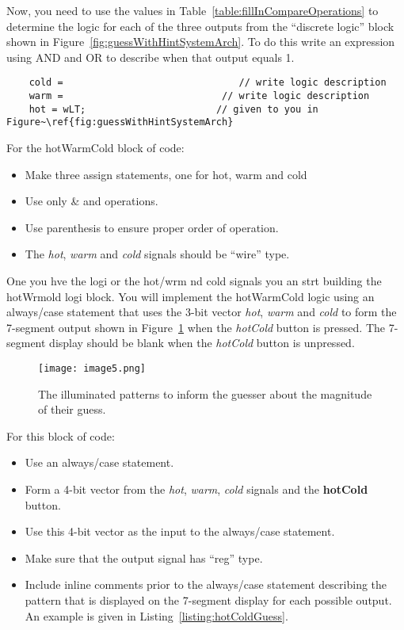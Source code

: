 Now, you need to use the values in Table~\ref{table:fillInCompareOperations} to determine the logic for
each of the three outputs from the ``discrete logic'' block shown in
Figure~\ref{fig:guessWithHintSystemArch}. To do this write an expression using AND and OR to 
describe when that
output equals 1.  

\protect\hypertarget{hotWarmCold_Logic}{}{}
\begin{verbatim}
	cold =                               // write logic description
	warm =                            // write logic description
	hot = wLT;                       // given to you in  Figure~\ref{fig:guessWithHintSystemArch}
\end{verbatim}

For the hotWarmCold block of code:

\begin{itemize}
\item
  Make three assign statements, one for hot, warm and cold
\item
  Use only \& and \textbar{} operations.
\item
  Use parenthesis to ensure proper order of operation.
\item
  The \emph{hot}, \emph{warm} and \emph{cold} signals should be ``wire''
  type.
\end{itemize}

One you hve the logi or the hot/wrm nd cold signals you an strt building the
hotWrmold logi block.
You will implement the hotWarmCold logic using an always/case statement
that uses the 3-bit vector \emph{hot}, \emph{warm} and \emph{cold} to form 
the 7-segment output shown in Figure~\ref{figure:hiLoHintSevenSeg} when 
the \emph{hotCold} button is pressed. The 7-segment display should be blank 
when the \emph{hotCold} button is unpressed.

\begin{figure}[ht]
\texttt{[image:  image5.png]}
\caption{The illuminated patterns to inform the guesser about the magnitude of their guess.}
\label{figure:hiLoHintSevenSeg}
\end{figure}

For this block of code:

\begin{itemize}
\item
  Use an always/case statement.
\item
  Form a 4-bit vector from the \emph{hot}, \emph{warm}, \emph{cold}
  signals and the \textbf{hotCold} button.
\item
  Use this 4-bit vector as the input to the always/case statement.
\item
  Make sure that the output signal has ``reg'' type.
\item
  Include inline comments prior to the always/case statement describing
  the pattern that is displayed on the 7-segment display for each
  possible output. An example is given in Listing~\ref{listing:hotColdGuess}.
\end{itemize}

